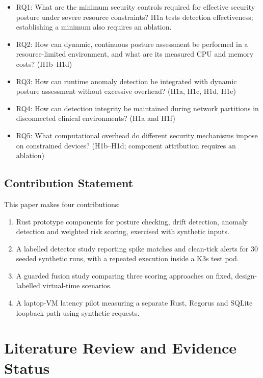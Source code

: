 \documentclass{ieeeaccess}
\renewcommand{\textbf}[1]{#1}
\begin{document}
\begin{itemize}
\item \textbf{RQ1:} What are the minimum security controls required for effective security posture under severe resource constraints? H1a tests detection effectiveness; establishing a minimum also requires an ablation.
\item {RQ2:} How can dynamic, continuous posture assessment be performed in a resource-limited environment, and what are its measured CPU and memory costs? (H1b--H1d)
\item {RQ3:} How can runtime anomaly detection be integrated with dynamic posture assessment without excessive overhead? (H1a, H1c, H1d, H1e)
\item {RQ4:} How can detection integrity be maintained during network partitions in disconnected clinical environments? (H1a and H1f)
\item {RQ5:} What computational overhead do different security mechanisms impose on constrained devices? (H1b--H1d; component attribution requires an ablation)
\end{itemize}

\subsection{Contribution Statement}
\label{subsec:contribution}

This paper makes four contributions:

\begin{enumerate}
\item {Rust prototype components} for posture checking, drift detection, anomaly detection and weighted risk scoring, exercised with synthetic inputs.
\item {A labelled detector study} reporting spike matches and clean-tick alerts for 30 seeded synthetic runs, with a repeated execution inside a K3s test pod.
\item {A guarded fusion study} comparing three scoring approaches on fixed, design-labelled virtual-time scenarios.
\item {A laptop-VM latency pilot} measuring a separate Rust, Regorus and SQLite loopback path using synthetic requests.
\end{enumerate}

\section{Literature Review and Evidence Status}
\label{sec:gapanalysis}
\end{document}
